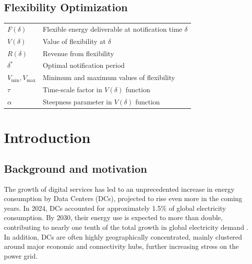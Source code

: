 \documentclass[preprint,12pt]{elsarticle}
\providecommand{\DIFaddend}{} %
\DeclareRobustCommand{\DIFaddend}{\DIFOaddend \let\includegraphics\DIFOincludegraphics} %
\begin{document}
\DIFaddend 

\vspace{1em}

\subsection*{Flexibility Optimization}
\begin{tabular}{ll}
$F(\delta)$ & Flexible energy deliverable at notification time $\delta$ \\
$V(\delta)$ & Value of flexibility at $\delta$ \\
$R(\delta)$ & Revenue from flexibility \\
$\delta^*$ & Optimal notification period \\
$V_{\min}, V_{\max}$ & Minimum and maximum values of flexibility \\
$\tau$ & Time-scale factor in $V(\delta)$ function \\
$\alpha$ & Steepness parameter in $V(\delta)$ function \\
\end{tabular}



\section{Introduction}
\subsection{Background and motivation}
The growth of digital services has led to an unprecedented increase in energy consumption by Data Centers (DCs), projected to rise even more in the coming years. In 2024, DCs accounted for approximately 1.5\% of global electricity consumption. By 2030, their energy use is expected to more than double, contributing to nearly one tenth of the total growth in global electricity demand \cite{iea2025energyai}. In addition, DCs are often highly geographically concentrated, mainly clustered around major economic and connectivity hubs, further increasing stress on the power grid. 
\end{document}
